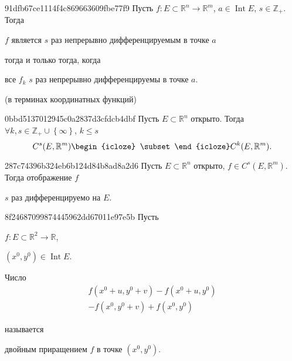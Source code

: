 \begin{note}{91dfb67ce1114f4c869663609fbe77f9}
    Пусть \({ f : E \subset \mathbb R^{n} \to \mathbb R^{m} }\),\: \({ a \in \operatorname{Int} E }\),\: \({ s \in \mathbb Z_+ }\).
    Тогда \begin{icloze}{2}\({ f }\) является \({ s }\) раз непрерывно дифференцируемым в точке \({ a }\)\end{icloze} \begin{icloze}{3}тогда и только тогда, когда\end{icloze} \begin{icloze}{1}все \({ f_k }\) \({ s }\) раз непрерывно дифференцируемы в точке \({ a }\).\end{icloze}

    \begin{center}
        \tiny
        (в терминах координатных функций)
    \end{center}
\end{note}

\begin{note}{0bbd5137012945c0a2837d3cfdcb4dbf}
    Пусть \({ E \subset \mathbb R^{n} }\) открыто.
    Тогда \({ \forall k,  s \in \mathbb Z_+ \cup \left\{ \infty \right\} }\),\: \({ k \leqslant s }\)
    \[
        C^{s}(E, \mathbb R^{m}) \begin{icloze}{1}\subset\end{icloze} C^{k}(E, \mathbb R^{m}).
    \]
\end{note}

\begin{note}{287c74396b324eb6b124d84b8ad8a2d6}
    Пусть \({ E \subset \mathbb R^{n} }\) открыто, \({ f \in C^{s}(E, \mathbb R^{m}) }\).
    Тогда отображение \({ f }\) \begin{icloze}{1}\({ s }\) раз дифференцируемо на \({ E }\).\end{icloze}
\end{note}

\begin{note}{8f24687099874445962dd67011e97e5b}
    Пусть \begin{icloze}{4}\({ f : E \subset \mathbb R^2 \to \mathbb R }\),\end{icloze}\: \begin{icloze}{3}\({ (x^{0}, y^{0}) \in \operatorname{Int} E }\).\end{icloze}
    \begin{icloze}{1}
        Число
        \begin{multline*}
            f(x^0 + u, y^0 + v) - f(x^0 + u, y^0) \\
            - f(x^0, y^0 + v) + f(x^0, y^0)
        \end{multline*}
    \end{icloze}
    называется \begin{icloze}{2}двойным приращением \({ f }\) в точке \({ (x^{0}, y^{0}) }\).\end{icloze}
\end{note}

